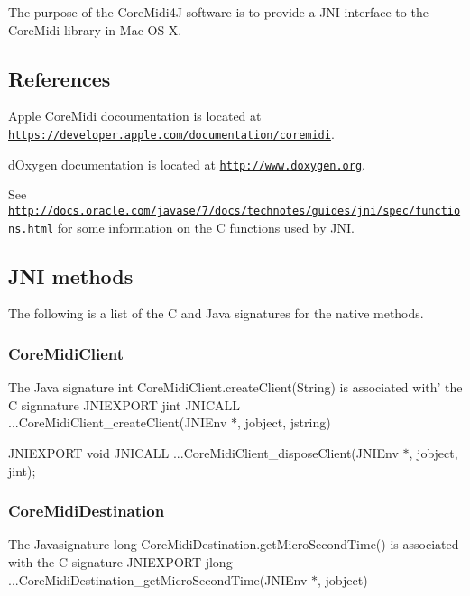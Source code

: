 The purpose of the CoreMidi4J software is to provide a JNI interface to the CoreMidi library in Mac OS X.

\subsection*{References}


\begin{DoxyItemize}
\item Apple CoreMidi docoumentation is located at \href{https://developer.apple.com/documentation/coremidi}{\tt https://developer.apple.com/documentation/coremidi}.
\item dOxygen documentation is located at \href{http://www.doxygen.org}{\tt http://www.doxygen.org}.
\item See \href{http://docs.oracle.com/javase/7/docs/technotes/guides/jni/spec/functions.html}{\tt http://docs.oracle.com/javase/7/docs/technotes/guides/jni/spec/functions.html} for some information on the C functions used by JNI.
\end{DoxyItemize}

\subsection*{JNI methods}

The following is a list of the C and Java signatures for the native methods.

\subsubsection*{CoreMidiClient}


\begin{DoxyItemize}
\item The Java signature {\ttfamily int CoreMidiClient.createClient(String) is associated with' the C signnature {\ttfamily JNIEXPORT jint JNICALL ...CoreMidiClient\_\-createClient(JNIEnv $\ast$, jobject, jstring)}}
\item {\ttfamily  JNIEXPORT void JNICALL ...CoreMidiClient\_\-disposeClient(JNIEnv $\ast$, jobject, jint);}
\end{DoxyItemize}

{\ttfamily  \subsubsection*{CoreMidiDestination}}

{\ttfamily }

{\ttfamily 
\begin{DoxyItemize}
\item The Javasignature {\ttfamily long CoreMidiDestination.getMicroSecondTime()} is associated with the C signature {\ttfamily JNIEXPORT jlong ...CoreMidiDestination\_\-getMicroSecondTime(JNIEnv $\ast$, jobject)}
\end{DoxyItemize}}

